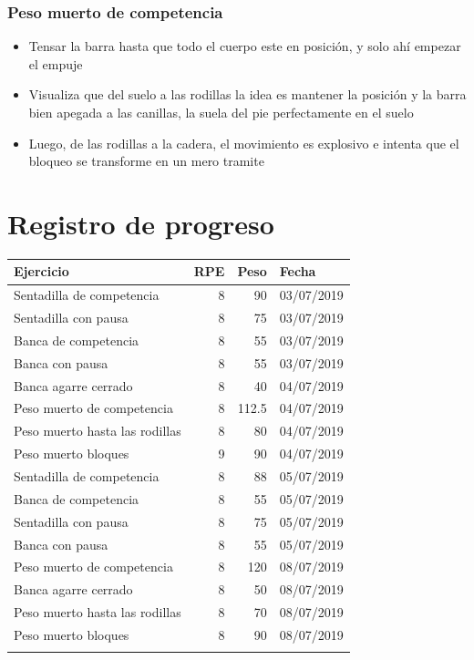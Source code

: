 \documentclass[11pt]{article}
\begin{document}
\subsubsection{Peso muerto de competencia}
\label{sec:org4800ede}
\begin{itemize}
\item Tensar la barra hasta que todo el cuerpo este en posición, y solo
ahí empezar el empuje
\item Visualiza que del suelo a las rodillas la idea es mantener la
posición y la barra bien apegada a las canillas, la suela del pie
perfectamente en el suelo
\item Luego, de las rodillas a la cadera, el movimiento es explosivo e
intenta que el bloqueo se transforme en un mero tramite
\end{itemize}
\section{Registro de progreso}
\label{sec:orga46964a}
\begin{center}
\label{tab:org0a2c746}
\begin{tabular}{lrrl}
Ejercicio & RPE & Peso & Fecha\\
\hline
Sentadilla de competencia & 8 & 90 & 03/07/2019\\
Sentadilla con pausa & 8 & 75 & 03/07/2019\\
Banca de competencia & 8 & 55 & 03/07/2019\\
Banca con pausa & 8 & 55 & 03/07/2019\\
Banca agarre cerrado & 8 & 40 & 04/07/2019\\
Peso muerto de competencia & 8 & 112.5 & 04/07/2019\\
Peso muerto hasta las rodillas & 8 & 80 & 04/07/2019\\
Peso muerto bloques & 9 & 90 & 04/07/2019\\
Sentadilla de competencia & 8 & 88 & 05/07/2019\\
Banca de competencia & 8 & 55 & 05/07/2019\\
Sentadilla con pausa & 8 & 75 & 05/07/2019\\
Banca con pausa & 8 & 55 & 05/07/2019\\
Peso muerto de competencia & 8 & 120 & 08/07/2019\\
Banca agarre cerrado & 8 & 50 & 08/07/2019\\
Peso muerto hasta las rodillas & 8 & 70 & 08/07/2019\\
Peso muerto bloques & 8 & 90 & 08/07/2019\\
 &  &  & \\
\end{tabular}
\end{center}
\end{document}

